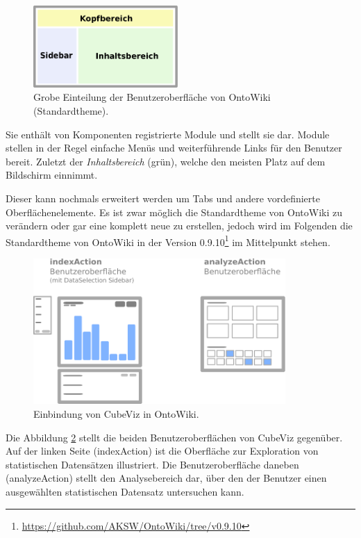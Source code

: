 \documentclass[11pt]{article}
\begin{document}
%
%
\begin{figure}[h!]
    \centering
    \includegraphics[width=5.5cm]{OntoWiki/UserInterfaceRegions.pdf}
    \caption{Grobe Einteilung der Benutzeroberfläche von OntoWiki (Standardtheme).}
    \label{fig:OntoWiki_UserInterfaceRegions}
\end{figure}

\noindent
Sie enthält von Komponenten registrierte Module und stellt sie dar. Module stellen in der Regel einfache Menüs und weiterführende Links für den Benutzer bereit. Zuletzt der \textit{Inhaltsbereich} (grün), welche den meisten Platz auf dem Bildschirm einnimmt. 

Dieser kann nochmals erweitert werden um Tabs und andere vordefinierte Oberflächenelemente. Es ist zwar möglich die Standardtheme von OntoWiki zu verändern oder gar eine komplett neue zu erstellen, jedoch wird im Folgenden die Standardtheme von OntoWiki in der Version 0.9.10\footnote{\url{https://github.com/AKSW/OntoWiki/tree/v0.9.10}} im Mittelpunkt stehen.

%
%
\begin{figure}[h!]
    \centering
    \includegraphics[width=9.6cm]{CubeViz/Overview.pdf}
    \caption{Einbindung von CubeViz in OntoWiki.}
    \label{fig:CubeViz_Overview}
\end{figure}

Die Abbildung \ref{fig:CubeViz_Overview} stellt die beiden Benutzeroberflächen von CubeViz gegenüber. Auf der linken Seite (indexAction) ist die Oberfläche zur Exploration von statistischen Datensätzen illustriert. Die Benutzeroberfläche daneben (analyzeAction) stellt den Analysebereich dar, über den der Benutzer einen ausgewählten statistischen Datensatz untersuchen kann.
\end{document}

